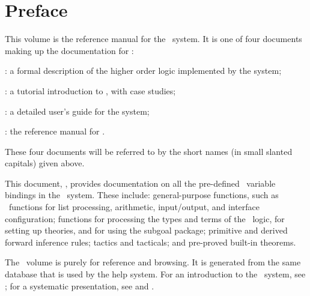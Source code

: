 \chapter*{Preface}

This volume is the reference manual for the \HOL\ system.
It is one of four documents making up the documentation for \HOL:

\begin{myenumerate}
\item \LOGIC: a formal description of the higher order logic
  implemented by the \HOL{} system;
\item \TUTORIAL: a tutorial introduction to \HOL, with case studies;
\item \DESCRIPTION: a detailed user's guide for the \HOL{} system;
\item \REFERENCE: the reference manual for \HOL.
\end{myenumerate}

\noindent These four documents will be referred to by the short names (in
small slanted capitals) given above.

This document, \REFERENCE, provides documentation on all the pre-defined \ML\
variable bindings in the \HOL\ system.  These include: general-purpose
functions, such as \ML\ functions for list processing, arithmetic,
input/output, and interface configuration; functions for processing the types
and terms of the \HOL\ logic, for setting up theories, and for using the
subgoal package; primitive and derived forward inference rules; tactics and
tacticals; and pre-proved built-in theorems.


The \REFERENCE\ volume is purely for reference and browsing. It is generated
from the same database that is used by the help system. For an introduction to
the \HOL\ system, see \TUTORIAL; for a systematic presentation, see
\DESCRIPTION{}  and \LOGIC{}.
